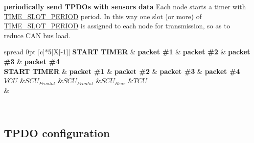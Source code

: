 \begin{DoxyEnumerate}
\item {\bfseries periodically send T\+P\+D\+Os with sensors\textquotesingle{} data} Each node starts a timer with \mbox{\hyperlink{group___common__defines__group_ga09c95853fd002fab968d94c5bc44e823}{T\+I\+M\+E\+\_\+\+S\+L\+O\+T\+\_\+\+P\+E\+R\+I\+OD}} period. In this way one slot (or more) of \mbox{\hyperlink{group___common__defines__group_ga09c95853fd002fab968d94c5bc44e823}{T\+I\+M\+E\+\_\+\+S\+L\+O\+T\+\_\+\+P\+E\+R\+I\+OD}} is assigned to each node for transmission, so as to reduce C\+AN bus load.~\newline
~\newline
 \tabulinesep=1mm
\begin{longtabu} spread 0pt [c]{*{5}{|X[-1]}|}
\hline
\rowcolor{\tableheadbgcolor}\textbf{ S\+T\+A\+RT T\+I\+M\+ER  }&\textbf{ packet \#1  }&\textbf{ packet \#2  }&\textbf{ packet \#3  }&\textbf{ packet \#4   }\\
\endfirsthead
\hline
\endfoot
\hline
\rowcolor{\tableheadbgcolor}\textbf{ S\+T\+A\+RT T\+I\+M\+ER  }&\textbf{ packet \#1  }&\textbf{ packet \#2  }&\textbf{ packet \#3  }&\textbf{ packet \#4   }\\
\endhead
$VCU$  &$SCU_{Frontal}$  &$SCU_{Frontal}$  &$SCU_{Rear}$  &$TCU$   \\
&\\
\end{longtabu}
~\newline
 


\end{DoxyEnumerate}

\subsection*{T\+P\+DO configuration}

